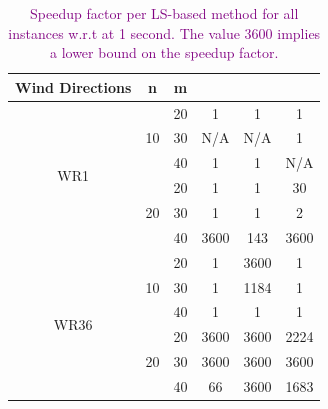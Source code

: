 \documentclass[preprint,12pt]{elsarticle}
\newcommand{\qcls}{{\sf {\small QC-LS\xspace}}}
\newcommand{\ilpls}{{\sf {\small ILP-LS\xspace}}}
\newcommand{\qulsgrb}{{\sf {\small QU-LS(GRB)\xspace}}}
\newcommand{\qulsda}{{\sf {\small QU-LS(DA)\xspace}}}
\begin{document}
\begin{table}[t!]
	\small
	\centering
	\begin{tabular}{| c | c | c | c | c | c | }
		\toprule
		Wind Directions  & n  & m  & \qcls &  \ilpls & \qulsgrb  \\
		\toprule
		\multirow{6}{*}{WR1}  & \multirow{3}{*}{10}  & 20 & 1       & 1 & 1  \\
		& & 30   & N/A & N/A & 1     \\
		& & 40 & 1 & 1 & N/A                \\
		\cline{2-6}
		&\multirow{3}{*}{20}   & 20  & 1  & 1  & 30         \\
		&&30   & 1 & 1  & 2    \\
		&&40   & 3600 & 143 & 3600        \\
		\hline
		\multirow{6}{*}{WR36} &  \multirow{3}{*}{10}    & 20 & 1       & 3600 & 1  \\
		&& 30  & 1 & 1184 & 1                     \\
		&&40   & 1 & 1 & 1          \\
		\cline{2-6}
		&  \multirow{3}{*}{20}   & 20   & 3600  & 3600 & 2224            \\
		&&30   & 3600 & 3600 & 3600                     \\
		&&40   & 66 & 3600 & 1683 \\
		\bottomrule                   
	\end{tabular}
	
	\vspace{0.5em}
	\caption{\textcolor{purple}{Speedup factor per LS-based method for all instances w.r.t \qulsda{} at 1 second. The value 3600 implies a lower bound on the speedup factor.}}\label{tab:results3}
\end{table}
\end{document}
